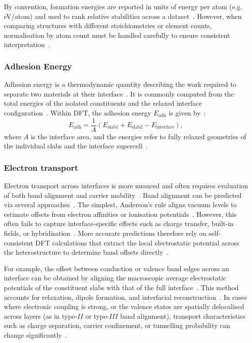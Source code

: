 By convention, formation energies are reported in units of energy per atom (e.g. eV/atom) and used to rank relative stabilities across a dataset~\nocite{}.
However, when comparing structures with different stoichiometries or element counts, normalisation by atom count must be handled carefully to ensure consistent interpretation~\nocite{}.

\subsubsection*{Adhesion Energy}

Adhesion energy is a thermodynamic quantity describing the work required to separate two materials at their interface~\nocite{}.
It is commonly computed from the total energies of the isolated constituents and the relaxed interface configuration~\nocite{}.
Within DFT, the adhesion energy $E_\mathrm{adh}$ is given by~\nocite{}:
\begin{equation}
    E_\mathrm{adh} = \frac{1}{A} \left( E_\mathrm{slab1} + E_\mathrm{slab2} - E_\mathrm{interface} \right),
\end{equation}
where $A$ is the interface area, and the energies refer to fully relaxed geometries of the individual slabs and the interface supercell~\nocite{}.

\subsubsection*{Electron transport}

Electron transport across interfaces is more nuanced and often requires evaluation of both band alignment and carrier mobility~\cite{Schusteritsch2015-lw, Leung2020-tv}.
Band alignment can be predicted via several approaches~\nocite{}.
The simplest, Anderson's rule aligns vacuum levels to estimate offsets from electron affinities or ionisation potentials~\cite{Butler2019-ws}.
However, this often fails to capture interface-specific effects such as charge transfer, built-in fields, or hybridisation~\nocite{}.
More accurate predictions therefore rely on self-consistent DFT calculations that extract the local electrostatic potential across the heterostructure to determine band offsets directly~\cite{Butler2019-ws, Leung2020-tv}.

For example, the offset between conduction or valence band edges across an interface can be obtained by aligning the macroscopic average electrostatic potentials of the constituent slabs with that of the full interface~\nocite{}.
This method accounts for relaxation, dipole formation, and interfacial reconstruction~\cite{Leung2020-tv}.
In cases where electronic coupling is strong, or the valence states are spatially delocalised across layers (as in type-$II$ or type-$III$ band alignment), transport characteristics such as charge separation, carrier confinement, or tunnelling probability can change significantly~\cite{Low2025-on}.

